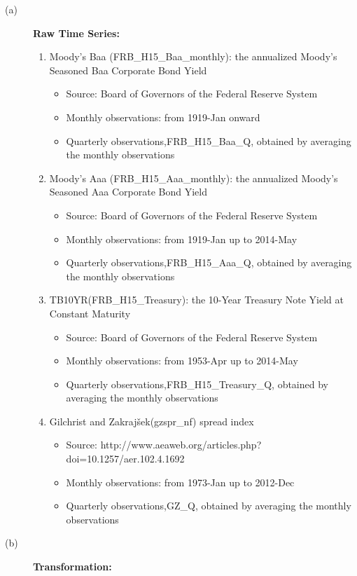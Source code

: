 \documentclass[3p,review,times]{elsarticle}		%
\begin{document}
\begin{description}
	\item[(a)] \textbf{Raw Time Series:}
	\begin{enumerate}
		\item Moody's Baa (FRB\_H15\_Baa\_monthly): the annualized Moody's Seasoned Baa Corporate Bond Yield
		\begin{itemize}
			\item Source: Board of Governors of the Federal Reserve System
			\item Monthly observations: from 1919-Jan onward
			\item Quarterly observations,FRB\_H15\_Baa\_Q, obtained by averaging the monthly observations
		\end{itemize}
		\item Moody's Aaa (FRB\_H15\_Aaa\_monthly): the annualized Moody's Seasoned Aaa Corporate Bond Yield
		\begin{itemize}
			\item Source: Board of Governors of the Federal Reserve System
			\item Monthly observations: from 1919-Jan up to 2014-May
			\item Quarterly observations,FRB\_H15\_Aaa\_Q, obtained by averaging the monthly observations
		\end{itemize}
		\item TB10YR(FRB\_H15\_Treasury): the 10-Year Treasury Note Yield at Constant Maturity 	
		\begin{itemize}
			\item Source: Board of Governors of the Federal Reserve System
			\item Monthly observations: from 1953-Apr up to 2014-May
			\item Quarterly observations,FRB\_H15\_Treasury\_Q, obtained by averaging the monthly observations
		\end{itemize}
		\item Gilchrist and Zakrajšek(gzspr\_nf) spread index 
		\begin{itemize}
			\item Source: http://www.aeaweb.org/articles.php?doi=10.1257/aer.102.4.1692
			\item Monthly observations: from 1973-Jan up to 2012-Dec
			\item Quarterly observations,GZ\_Q, obtained by averaging the monthly observations
		\end{itemize}		
	\end{enumerate}
	\item[(b)] \textbf{Transformation:}

\end{description}
\end{document}
